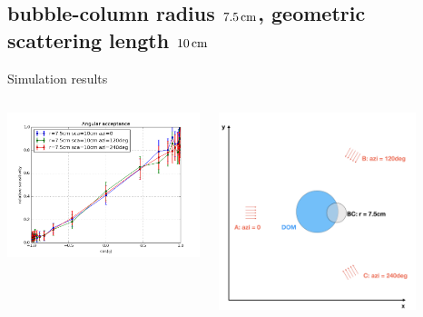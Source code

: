 \subsection{bubble-column radius $7.5\text{\,cm}$, geometric scattering length $10\text{\,cm}$}
\begin{frame}[fragile]{Simulation results}
  \begin{columns}
    \begin{column}{0.5\textwidth}
      \includegraphics[width=\textwidth]{img/summer_scenario_r7-5cm_sca10cm}
    \end{column}
    \begin{column}{0.5\textwidth}
      \includegraphics[width=0.8\textwidth]{img/summerscenario-003}
    \end{column}
  \end{columns}


\end{frame}
